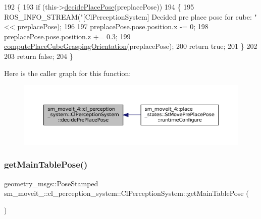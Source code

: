 \begin{DoxyCode}
192             \{
193                 \textcolor{keywordflow}{if} (this->\hyperlink{classsm__moveit__4_1_1cl__perception__system_1_1ClPerceptionSystem_af6ff9a225d451bdee312573296ed02a8}{decidePlacePose}(preplacePose))
194                 \{
195                     ROS\_INFO\_STREAM(\textcolor{stringliteral}{"[ClPerceptionSystem] Decided pre place pose for cube: "} << 
      preplacePose);
196 
197                     preplacePose.pose.position.x -= 0;
198                     preplacePose.pose.position.z += 0.3;
199                     \hyperlink{classsm__moveit__4_1_1cl__perception__system_1_1ClPerceptionSystem_afda35b6252c0a5c0692e3ff956609c23}{computePlaceCubeGraspingOrientation}(preplacePose);
200                     \textcolor{keywordflow}{return} \textcolor{keyword}{true};
201                 \}
202 
203                 \textcolor{keywordflow}{return} \textcolor{keyword}{false};
204             \}
\end{DoxyCode}
Here is the caller graph for this function\+:
\nopagebreak
\begin{figure}[H]
\begin{center}
\leavevmode
\includegraphics[width=350pt]{classsm__moveit__4_1_1cl__perception__system_1_1ClPerceptionSystem_a027d06bc7cba5ace251a65bb29777c26_icgraph}
\end{center}
\end{figure}
\mbox{\label{classsm__moveit__4_1_1cl__perception__system_1_1ClPerceptionSystem_a234d70a76bb5bf73f23d420c2b541632}} 
\subsubsection{\texorpdfstring{get\+Main\+Table\+Pose()}{getMainTablePose()}}
{\footnotesize\ttfamily geometry\+\_\+msgs\+::\+Pose\+Stamped sm\+\_\+moveit\+\_\+::cl\+\_\+perception\+\_\+system\+::\+Cl\+Perception\+System\+::get\+Main\+Table\+Pose (\begin{DoxyParamCaption}{ }\end{DoxyParamCaption})\hspace{0.3cm}{\ttfamily [inline]}}



